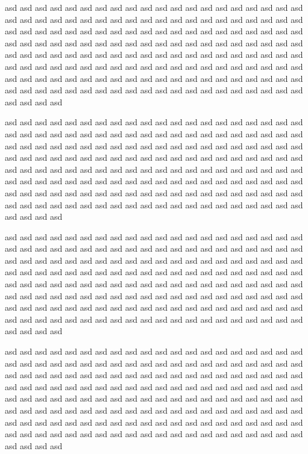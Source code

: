\documentclass[article]{ajs}
\begin{document}
asd asd asd asd asd asd asd asd asd asd asd asd asd asd asd asd asd asd asd asd asd asd asd asd asd asd asd asd asd asd asd asd asd asd asd asd asd asd asd asd asd asd asd asd asd asd asd asd asd asd asd asd asd asd asd asd asd asd asd asd asd asd asd asd asd asd asd asd asd asd asd asd asd asd asd asd asd asd asd asd asd asd asd asd asd asd asd asd asd asd asd asd asd asd asd asd asd asd asd asd asd asd asd asd asd asd asd asd asd asd asd asd asd asd asd asd asd asd asd asd asd asd asd asd asd asd asd asd asd asd asd asd asd asd asd asd asd asd asd asd asd asd asd asd asd asd asd asd asd asd asd asd asd asd asd asd asd asd asd asd asd asd asd asd 

asd asd asd asd asd asd asd asd asd asd asd asd asd asd asd asd asd asd asd asd asd asd asd asd asd asd asd asd asd asd asd asd asd asd asd asd asd asd asd asd asd asd asd asd asd asd asd asd asd asd asd asd asd asd asd asd asd asd asd asd asd asd asd asd asd asd asd asd asd asd asd asd asd asd asd asd asd asd asd asd asd asd asd asd asd asd asd asd asd asd asd asd asd asd asd asd asd asd asd asd asd asd asd asd asd asd asd asd asd asd asd asd asd asd asd asd asd asd asd asd asd asd asd asd asd asd asd asd asd asd asd asd asd asd asd asd asd asd asd asd asd asd asd asd asd asd asd asd asd asd asd asd asd asd asd asd asd asd asd asd asd asd asd asd 

asd asd asd asd asd asd asd asd asd asd asd asd asd asd asd asd asd asd asd asd asd asd asd asd asd asd asd asd asd asd asd asd asd asd asd asd asd asd asd asd asd asd asd asd asd asd asd asd asd asd asd asd asd asd asd asd asd asd asd asd asd asd asd asd asd asd asd asd asd asd asd asd asd asd asd asd asd asd asd asd asd asd asd asd asd asd asd asd asd asd asd asd asd asd asd asd asd asd asd asd asd asd asd asd asd asd asd asd asd asd asd asd asd asd asd asd asd asd asd asd asd asd asd asd asd asd asd asd asd asd asd asd asd asd asd asd asd asd asd asd asd asd asd asd asd asd asd asd asd asd asd asd asd asd asd asd asd asd asd asd asd asd asd asd 

asd asd asd asd asd asd asd asd asd asd asd asd asd asd asd asd asd asd asd asd asd asd asd asd asd asd asd asd asd asd asd asd asd asd asd asd asd asd asd asd asd asd asd asd asd asd asd asd asd asd asd asd asd asd asd asd asd asd asd asd asd asd asd asd asd asd asd asd asd asd asd asd asd asd asd asd asd asd asd asd asd asd asd asd asd asd asd asd asd asd asd asd asd asd asd asd asd asd asd asd asd asd asd asd asd asd asd asd asd asd asd asd asd asd asd asd asd asd asd asd asd asd asd asd asd asd asd asd asd asd asd asd asd asd asd asd asd asd asd asd asd asd asd asd asd asd asd asd asd asd asd asd asd asd asd asd asd asd asd asd asd asd asd asd 
\end{document}
